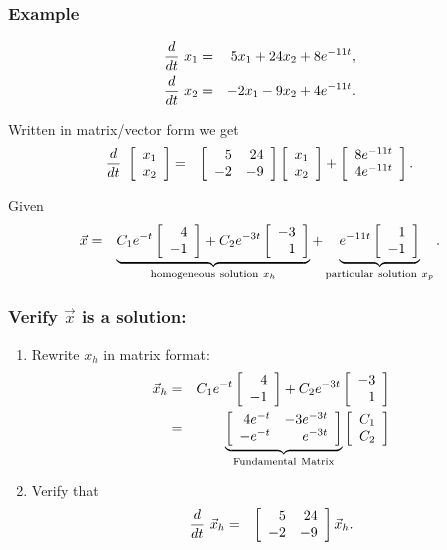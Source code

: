 \begin{frame}
  \frametitle{Example}

  \begin{eqnarray*}
    \deriv{~}{t} x_1 & = & 5  x_1 + 24 x_2 + 8 e^{-11t}, \\
    \deriv{~}{t} x_2 & = & -2 x_1 -  9 x_2 + 4 e^{-11t}.
  \end{eqnarray*}

  {
    Written in matrix/vector form we get
    \begin{eqnarray*}
      \deriv{~}{t} \vecTwo{x_1}{x_2} & = & 
      \arrayTwo{5}{24}{-2}{-9} \vecTwo{x_1}{x_2}
      + \vecTwo{8e^{-11t}}{4e^{-11t}}.
    \end{eqnarray*}
  }

  {
   Given  
    \begin{eqnarray*}
      \vec{x} & = &  
      \underbrace{C_1 e^{-t} \vecTwo{4}{-1} + C_2 e^{-3t} \vecTwo{-3}{1}}_{\mathrm{homogeneous ~solution~} x_h} 
      + \underbrace{ e^{-11t} \vecTwo{1}{-1}}_{\mathrm{particular~ solution}~ x_p}.
    \end{eqnarray*}
  }
\end{frame}


\begin{frame}
  \frametitle{Verify $\vec{x}$ is a solution:}

  \begin{enumerate}
  \item Rewrite $x_h$ in matrix format: 
    \begin{eqnarray*}
      \vec{x}_h & = & C_1 e^{-t} \vecTwo{4}{-1} 
      + C_2 e^{-3t} \vecTwo{-3}{1}\\
      & = & 
      \underbrace{\arrayTwo{4e^{-t}}{-3e^{-3t}}{-e^{-t}}{e^{-3t}}}_{\mathrm{Fundamental~Matrix}}
      \vecTwo{C_1}{C_2} 
    \end{eqnarray*}
   
  \item Verify that  
    \begin{eqnarray*}
      \deriv{~}{t} \vec{x}_h & = & \arrayTwo{5}{24}{-2}{-9} \vec{x}_h.
    \end{eqnarray*}
 
  \end{enumerate}

\end{frame}

